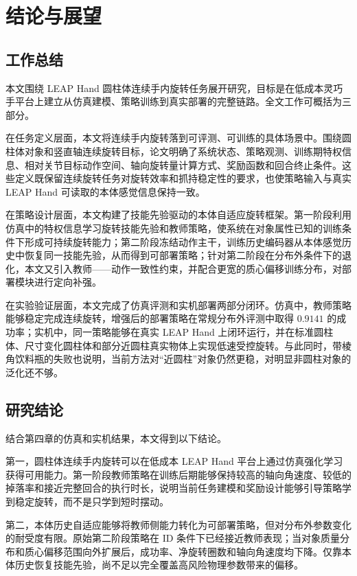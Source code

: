 
\section{结论与展望}

\subsection{工作总结}
\thesisbodyfont
本文围绕 LEAP Hand 圆柱体连续手内旋转任务展开研究，目标是在低成本灵巧手平台上建立从仿真建模、策略训练到真实部署的完整链路。全文工作可概括为三部分。

在任务定义层面，本文将连续手内旋转落到可评测、可训练的具体场景中。围绕圆柱体对象和竖直轴连续旋转目标，论文明确了系统状态、策略观测、训练期特权信息、相对关节目标动作空间、轴向旋转量计算方式、奖励函数和回合终止条件。这些定义既保留连续旋转任务对旋转效率和抓持稳定性的要求，也使策略输入与真实 LEAP Hand 可读取的本体感觉信息保持一致。

在策略设计层面，本文构建了技能先验驱动的本体自适应旋转框架。第一阶段利用仿真中的特权信息学习旋转技能先验和教师策略，使系统在对象属性已知的训练条件下形成可持续旋转能力；第二阶段冻结动作主干，训练历史编码器从本体感觉历史中恢复同一技能先验，从而得到可部署策略；针对第二阶段在分布外条件下的退化，本文又引入教师——动作一致性约束，并配合更宽的质心偏移训练分布，对部署模块进行定向补强。

在实验验证层面，本文完成了仿真评测和实机部署两部分闭环。仿真中，教师策略能够稳定完成连续旋转，增强后的部署策略在常规分布外评测中取得 \(0.9141\) 的成功率；实机中，同一策略能够在真实 LEAP Hand 上闭环运行，并在标准圆柱体、尺寸变化圆柱体和部分近圆柱真实物体上实现低速受控旋转。与此同时，带棱角饮料瓶的失败也说明，当前方法对“近圆柱”对象仍然更稳，对明显非圆柱对象的泛化还不够。

\subsection{研究结论}
\thesisbodyfont
结合第四章的仿真和实机结果，本文得到以下结论。

第一，圆柱体连续手内旋转可以在低成本 LEAP Hand 平台上通过仿真强化学习获得可用能力。第一阶段教师策略在训练后期能够保持较高的轴向角速度、较低的掉落率和接近完整回合的执行时长，说明当前任务建模和奖励设计能够引导策略学到稳定旋转，而不是只学到短时摆动。

第二，本体历史自适应能够将教师侧能力转化为可部署策略，但对分布外参数变化的耐受度有限。原始第二阶段策略在 ID 条件下已经接近教师表现；当对象质量分布和质心偏移范围向外扩展后，成功率、净旋转圈数和轴向角速度均下降。仅靠本体历史恢复技能先验，尚不足以完全覆盖高风险物理参数带来的偏移。

